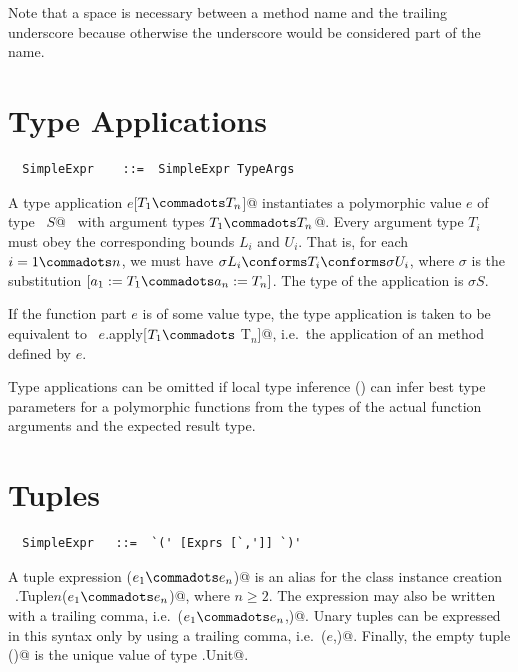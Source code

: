 Note that a space is necessary between a method name and the trailing underscore
because otherwise the underscore would be considered part of the name.  

\section{Type Applications}
\label{sec:type-app}
\syntax\begin{lstlisting}
  SimpleExpr    ::=  SimpleExpr TypeArgs
\end{lstlisting}

A type application \lstinline@$e$[$T_1 \commadots T_n$]@ instantiates
a polymorphic value $e$ of type ~\lstinline@[$a_1$ >: $L_1$ <: $U_1
\commadots a_n$ >: $L_n$ <: $U_n$]$S$@~ with argument types
\lstinline@$T_1 \commadots T_n$@.  Every argument type $T_i$ must obey
the corresponding bounds $L_i$ and $U_i$.  That is, for each $i = 1
\commadots n$, we must have $\sigma L_i \conforms T_i \conforms \sigma
U_i$, where $\sigma$ is the substitution $[a_1 := T_1 \commadots a_n
:= T_n]$.  The type of the application is $\sigma S$.

If the function part $e$ is of some value type, the type application
is taken to be equivalent to 
~\lstinline@$e$.apply[$T_1 \commadots$ T$_n$]@, i.e.\ the application of an  method defined by
$e$.

Type applications can be omitted if local type inference
() can infer best type parameters for a
polymorphic functions from the types of the actual function arguments
and the expected result type.

\section{Tuples}
\label{sec:tuples}

\syntax\begin{lstlisting}
  SimpleExpr   ::=  `(' [Exprs [`,']] `)'
\end{lstlisting}

A tuple expression \lstinline@($e_1 \commadots e_n$)@ is an alias
for the class instance creation 
~\lstinline@scala.Tuple$n$($e_1 \commadots e_n$)@, where $n \geq 2$.  
The expression may also be written
with a trailing comma, i.e.\ \lstinline@($e_1 \commadots e_n$,)@.
Unary tuples can be expressed in
this syntax only by using a trailing comma,
i.e.\ \lstinline@($e$,)@. Finally, the empty tuple
\lstinline@()@ is the unique value of type \lstinline@scala.Unit@.

